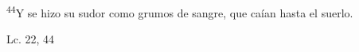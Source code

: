 \documentclass[../../rosario.tex]{subfiles}
\begin{document}
    \textsuperscript{44}Y se hizo su sudor como grumos de sangre, que caían hasta el suerlo.
    \begin{flushright}
    Lc. 22, 44
    \end{flushright}
\end{document}
